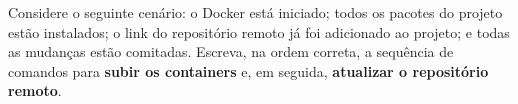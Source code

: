 \begin{questao}[0,3 ponto]
Considere o seguinte cenário: o Docker está iniciado; todos os pacotes do
projeto estão instalados; o link do repositório remoto já foi adicionado ao
projeto; e todas as mudanças estão comitadas. Escreva, na ordem correta, a
sequência de comandos para \textbf{subir os containers} e, em seguida,
\textbf{atualizar o repositório remoto}.

\end{questao}
